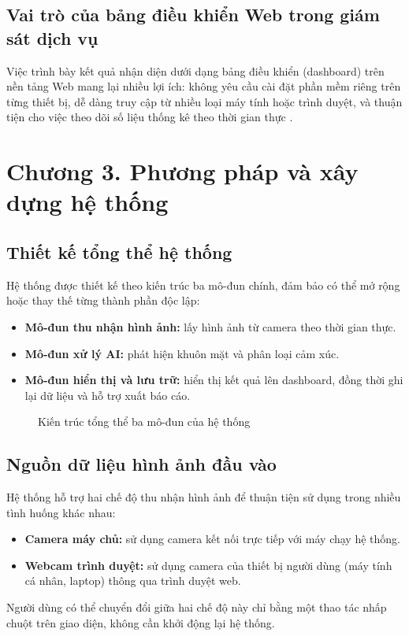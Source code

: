 \documentclass{iaesarticle}
\begin{document}
\subsection{Vai trò của bảng điều khiển Web trong giám sát dịch vụ}
Việc trình bày kết quả nhận diện dưới dạng bảng điều khiển (dashboard) trên nền tảng Web mang lại nhiều lợi ích: không yêu cầu cài đặt phần mềm riêng trên từng thiết bị, dễ dàng truy cập từ nhiều loại máy tính hoặc trình duyệt, và thuận tiện cho việc theo dõi số liệu thống kê theo thời gian thực \citep{opencv, tensorflow}.

\section{Chương 3. Phương pháp và xây dựng hệ thống}
\label{sec:method}

\subsection{Thiết kế tổng thể hệ thống}
Hệ thống được thiết kế theo kiến trúc ba mô-đun chính, đảm bảo có thể mở rộng hoặc thay thế từng thành phần độc lập:
\begin{itemize}[topsep=0.3ex, itemsep=0.3ex, parsep=0.2ex]
	\item[-] \textbf{Mô-đun thu nhận hình ảnh:} lấy hình ảnh từ camera theo thời gian thực.
	\item[-] \textbf{Mô-đun xử lý AI:} phát hiện khuôn mặt và phân loại cảm xúc.
	\item[-] \textbf{Mô-đun hiển thị và lưu trữ:} hiển thị kết quả lên dashboard, đồng thời ghi lại dữ liệu và hỗ trợ xuất báo cáo.
\end{itemize}

\begin{figure}[H]
\centering
{}
\vspace{.7em}
\caption{Kiến trúc tổng thể ba mô-đun của hệ thống}
\end{figure}

\subsection{Nguồn dữ liệu hình ảnh đầu vào}
Hệ thống hỗ trợ hai chế độ thu nhận hình ảnh để thuận tiện sử dụng trong nhiều tình huống khác nhau:
\begin{itemize}[topsep=0.3ex, itemsep=0.3ex, parsep=0.2ex]
	\item[-] \textbf{Camera máy chủ:} sử dụng camera kết nối trực tiếp với máy chạy hệ thống.
	\item[-] \textbf{Webcam trình duyệt:} sử dụng camera của thiết bị người dùng (máy tính cá nhân, laptop) thông qua trình duyệt web.
\end{itemize}
Người dùng có thể chuyển đổi giữa hai chế độ này chỉ bằng một thao tác nhấp chuột trên giao diện, không cần khởi động lại hệ thống.
\end{document}
